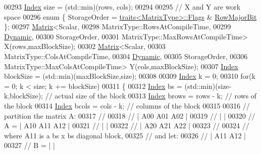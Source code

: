 \begin{DoxyCode}
00293   \hyperlink{class_eigen_1_1internal_1_1_upper_bidiagonalization_adcb14f3919a3dcc9977ba6b8105087fe}{Index} size = (std::min)(rows, cols);
00294 
00295   \textcolor{comment}{// X and Y are work space}
00296   \textcolor{keyword}{enum} \{ StorageOrder = \hyperlink{struct_eigen_1_1internal_1_1traits}{traits<MatrixType>::Flags} & 
      \hyperlink{group__flags_gae4f56c2a60bbe4bd2e44c5b19cbe8762}{RowMajorBit} \};
00297   \hyperlink{group___core___module_class_eigen_1_1_matrix}{Matrix}<Scalar,
00298          MatrixType::RowsAtCompileTime,
00299          \hyperlink{namespace_eigen_ad81fa7195215a0ce30017dfac309f0b2}{Dynamic},
00300          StorageOrder,
00301          MatrixType::MaxRowsAtCompileTime> X(rows,maxBlockSize);
00302   \hyperlink{group___core___module_class_eigen_1_1_matrix}{Matrix}<Scalar,
00303          MatrixType::ColsAtCompileTime,
00304          \hyperlink{namespace_eigen_ad81fa7195215a0ce30017dfac309f0b2}{Dynamic},
00305          StorageOrder,
00306          MatrixType::MaxColsAtCompileTime> Y(cols,maxBlockSize);
00307   \hyperlink{class_eigen_1_1internal_1_1_upper_bidiagonalization_adcb14f3919a3dcc9977ba6b8105087fe}{Index} blockSize = (std::min)(maxBlockSize,size);
00308 
00309   \hyperlink{class_eigen_1_1internal_1_1_upper_bidiagonalization_adcb14f3919a3dcc9977ba6b8105087fe}{Index} k = 0;
00310   \textcolor{keywordflow}{for}(k = 0; k < size; k += blockSize)
00311   \{
00312     \hyperlink{class_eigen_1_1internal_1_1_upper_bidiagonalization_adcb14f3919a3dcc9977ba6b8105087fe}{Index} bs = (std::min)(size-k,blockSize);  \textcolor{comment}{// actual size of the block}
00313     \hyperlink{class_eigen_1_1internal_1_1_upper_bidiagonalization_adcb14f3919a3dcc9977ba6b8105087fe}{Index} brows = rows - k;                   \textcolor{comment}{// rows of the block}
00314     \hyperlink{class_eigen_1_1internal_1_1_upper_bidiagonalization_adcb14f3919a3dcc9977ba6b8105087fe}{Index} bcols = cols - k;                   \textcolor{comment}{// columns of the block}
00315 
00316     \textcolor{comment}{// partition the matrix A:}
00317     \textcolor{comment}{// }
00318     \textcolor{comment}{//      | A00 A01 A02 |}
00319     \textcolor{comment}{//      |             |}
00320     \textcolor{comment}{// A  = | A10 A11 A12 |}
00321     \textcolor{comment}{//      |             |}
00322     \textcolor{comment}{//      | A20 A21 A22 |}
00323     \textcolor{comment}{//}
00324     \textcolor{comment}{// where A11 is a bs x bs diagonal block,}
00325     \textcolor{comment}{// and let:}
00326     \textcolor{comment}{//      | A11 A12 |}
00327     \textcolor{comment}{//  B = |         |}

\end{DoxyCode}
